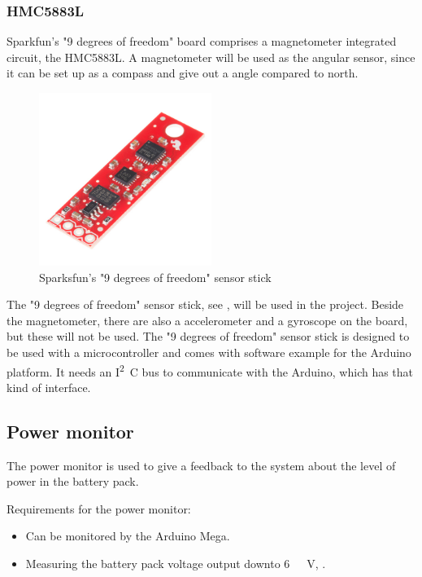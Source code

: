 \subsubsection{HMC5883L}
Sparkfun's "9 degrees of freedom" board  comprises a magnetometer integrated circuit, the HMC5883L\cite{HMC5883L}. A magnetometer will be used as the angular sensor, since it can be set up as a compass and give out a angle compared to north. 

\begin{figure}[H]
	\centering
	\includegraphics[width=0.50\textwidth]{figures/NineDegree.jpg}
		\caption{Sparksfun's "9 degrees of freedom" sensor stick } 
	\label{NineDegree}
\end{figure}


The "9 degrees of freedom" sensor stick, see , will be used in the project. Beside the magnetometer, there are also a accelerometer and a gyroscope on the board, but these will not be used. The "9 degrees of freedom" sensor stick is designed to be used with a microcontroller and comes with software example for the Arduino platform. It needs an  \si{I^2C} bus to communicate with the Arduino, which has that kind of interface.


\subsection{Power monitor}
The power monitor is used to give a feedback to the system about the level of power in the battery pack.

Requirements for the power monitor:
\begin{itemize}
\item Can be monitored by the Arduino Mega.
\item Measuring the battery pack voltage output downto \si{6\ V}, .
\end{itemize}

